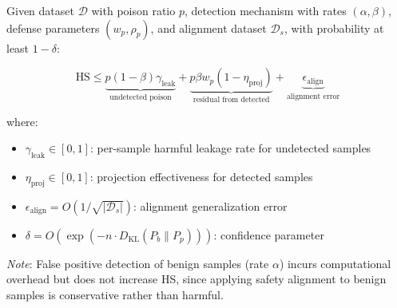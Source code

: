 \begin{theorem}
\label{thm:safety_bound}
Given dataset $\mathcal{D}$ with poison ratio $p$, detection mechanism with rates $(\alpha, \beta)$, defense parameters $(w_p, \rho_p)$, and alignment dataset $\mathcal{D}_s$, with probability at least $1 - \delta$:

\begin{equation}
\text{HS} \leq \underbrace{p(1-\beta)\gamma_{\text{leak}}}_{\text{undetected poison}} + \underbrace{p \beta w_p (1-\eta_{\text{proj}})}_{\text{residual from detected}} + \underbrace{\epsilon_{\text{align}}}_{\text{alignment error}}
\end{equation}

where:
\begin{itemize}
    \item $\gamma_{\text{leak}} \in [0,1]$: per-sample harmful leakage rate for undetected samples
    \item $\eta_{\text{proj}} \in [0,1]$: projection effectiveness for detected samples
    \item $\epsilon_{\text{align}} = O(1/\sqrt{|\mathcal{D}_s|})$: alignment generalization error
    \item $\delta = O(\exp(-n \cdot D_{\text{KL}}(P_b \| P_p)))$: confidence parameter
\end{itemize}

\textit{Note}: False positive detection of benign samples (rate $\alpha$) incurs computational overhead but does not increase HS, since applying safety alignment to benign samples is conservative rather than harmful.
\end{theorem}

